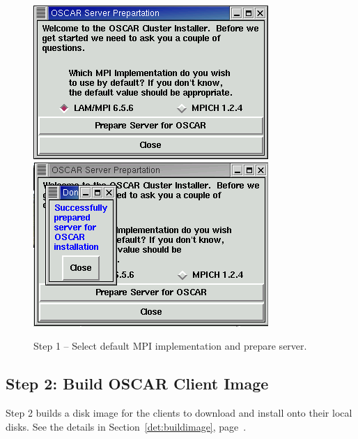 \begin{figure}[hb!]
  \begin{center}
    \centerline{
      \includegraphics[scale=\imgscale]{figs/3a_sbs-wizard-step1}
      \hspace{\imghskip}
      \includegraphics[scale=\imgscale]{figs/3b_sbs-wizard-step1}
      }
    \caption{Step 1 -- Select default MPI implementation and prepare server.}
    \label{fig:sbs-install-wizard-s1}
  \end{center}
\end{figure}



\subsection{Step 2: Build OSCAR Client Image}

Step 2 builds a disk image for the clients to download and install
onto their local disks.  See the details in
Section~\ref{det:buildimage}, page~\pageref{det:buildimage}.

